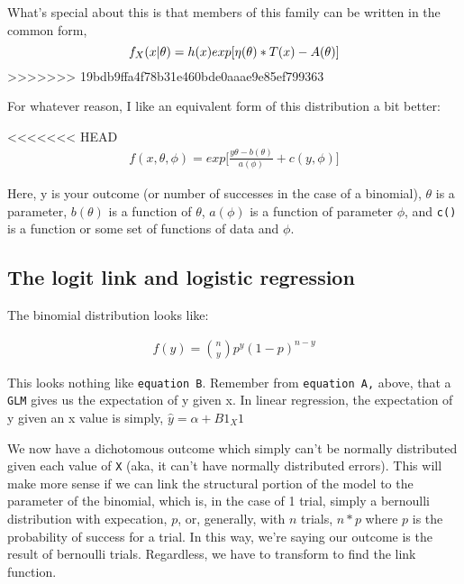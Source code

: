 \documentclass[
]{article}
\begin{document}
What's special about this is that members of this family can be written
in the common form,\\
\begin{equation}
  $$f_X(x|\theta) = h(x)exp[\eta(\theta)*T(x) - A(\theta)]$$

\end{equation}
>>>>>>> 19bdb9ffa4f78b31e460bde0aaae9e85ef799363

For whatever reason, I like an equivalent form of this distribution a
bit better:

<<<<<<< HEAD
\begin{align}
\tag{B}
f(x, \theta, \phi) = exp\biggl[\frac{y\theta-b(\theta)}{a(\phi)} + c(y, \phi)\biggr] 
\end{align}

Here, y is your outcome (or number of successes in the case of a
binomial), \(\theta\) is a parameter, \(b(\theta)\) is a function of
\(\theta\), \(a(\phi)\) is a function of parameter \(\phi\), and
\texttt{c()} is a function or some set of functions of data and
\(\phi\).

\hypertarget{the-logit-link-and-logistic-regression}{%
\subsection{The logit link and logistic
regression}\label{the-logit-link-and-logistic-regression}}

The binomial distribution looks like:

\begin{align}
\tag{C}
f(y) = {n \choose y}p^y(1-p)^{n-y}
\end{align}

This looks nothing like \texttt{equation\ B}. Remember from
\texttt{equation\ A,} above, that a \texttt{GLM} gives us the
expectation of y given x. In linear regression, the expectation of y
given an x value is simply, \(\hat{y} = \alpha + B1_X1\)

We now have a dichotomous outcome which simply can't be normally
distributed given each value of \texttt{X} (aka, it can't have normally
distributed errors). This will make more sense if we can link the
structural portion of the model to the parameter of the binomial, which
is, in the case of 1 trial, simply a bernoulli distribution with
expecation, \(p\), or, generally, with \(n\) trials, \(n*p\) where \(p\)
is the probability of success for a trial. In this way, we're saying our
outcome is the result of bernoulli trials. Regardless, we have to
transform to find the link function.
\end{document}
